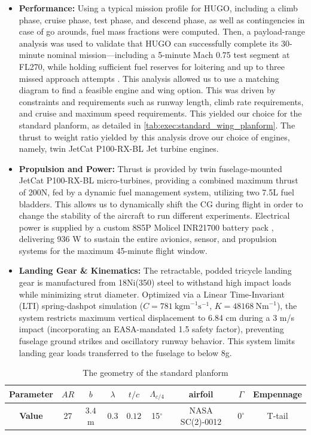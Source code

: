 \begin{itemize}
    \item \textbf{Performance:} Using a typical mission profile for HUGO, including a climb phase, cruise phase, test phase, and descend phase, as well as contingencies in case of go arounds, fuel mass fractions were computed. Then, a payload-range analysis was used to validate that HUGO can successfully complete its 30-minute nominal mission—including a 5-minute Mach 0.75 test segment at FL270, while holding sufficient fuel reserves for loitering and up to three missed approach attempts \cite{Koutz1952Loitering}. This analysis allowed us to use a matching diagram to find a feasible engine and wing option. This was driven by constraints and requirements such as runway length, climb rate requirements, and cruise and maximum speed requirements. This yielded our choice for the standard planform, as detailed in \autoref{tab:exec:standard_wing_planform}. The thrust to weight ratio yielded by this analysis drove our choice of engines, namely, twin JetCat P100-RX-BL Jet turbine engines.
    \item \textbf{Propulsion and Power:} Thrust is provided by twin fuselage-mounted JetCat P100-RX-BL micro-turbines, providing a combined maximum thrust of 200N, fed by a dynamic fuel management system, utilizing two 7.5L fuel bladders. This allows us to dynamically shift the CG during flight in order to change the stability of the aircraft to run different experiments. Electrical power is supplied by a custom 8S5P Molicel INR21700 battery pack \cite{Tsung-Hsun2026, Ganjeizadeh2014}, delivering 936 W to sustain the entire avionics, sensor, and propulsion systems for the maximum 45-minute flight window. 
    \item \textbf{Landing Gear \& Kinematics:} The retractable, podded tricycle landing gear is manufactured from 18Ni(350) steel to withstand high impact loads while minimizing strut diameter. Optimized via a Linear Time-Invariant (LTI) spring-dashpot simulation ($C=781\ \mathrm{kgm}^{-1}\mathrm s^{-1}$, $K=48168\ \mathrm{Nm}^{-1}$), the system restricts maximum vertical displacement to 6.84 cm during a 3 m/s impact (incorporating an EASA-mandated 1.5 safety factor), preventing fuselage ground strikes and oscillatory runway behavior. This system limits landing gear loads transferred to the fuselage to below 8g.
    
\end{itemize}

\begin{table}[H]
    \centering
    \caption{The geometry of the standard planform}
    \begin{tabular}{|c||c|c|c|c|c|c|c|c|}\hline
         \textbf{Parameter}& $AR$ & $b$ & $\lambda$& $t/c$ & $\Lambda_{c/4}$ & airfoil & $\Gamma$ & Empennage  \\\hline
         \textbf{Value} & 27 & $3.4$ m & 0.3 & $0.12$ & 15$^\circ$ & NASA SC(2)-0012 & $0^\circ$ & T-tail\\\hline
    \end{tabular}
    
    \label{tab:exec:standard_wing_planform}
\end{table}



